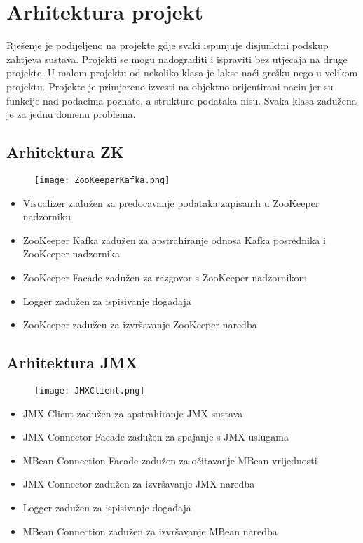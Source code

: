 \documentclass[times, utf8, diplomski, numeric]{fer}
\begin{document}
\section{Arhitektura projekt}

Rješenje je podijeljeno na projekte gdje svaki ispunjuje disjunktni podskup zahtjeva sustava. Projekti se mogu nadograditi i ispraviti bez utjecaja na druge projekte. U malom projektu od nekoliko klasa je lakse naći grešku nego u velikom projektu. Projekte je primjereno izvesti na objektno orijentirani nacin jer su funkcije nad podacima poznate, a strukture podataka nisu. Svaka klasa zadužena je za jednu domenu problema.

\subsection{Arhitektura ZK}

\begin{figure}[H]
    \centering
    \texttt{[image: ZooKeeperKafka.png]}
    \caption{}
    \label{fig:zookeeper-kafka}
\end{figure}

\begin{itemize}
    \item Visualizer zadužen za predocavanje podataka zapisanih u ZooKeeper nadzorniku
    \item ZooKeeper Kafka zadužen za apstrahiranje odnosa Kafka posrednika i ZooKeeper nadzornika
    \item ZooKeeper Facade zadužen za razgovor s ZooKeeper nadzornikom
    \item Logger zadužen za ispisivanje događaja
    \item ZooKeeper zadužen za izvršavanje ZooKeeper naredba
\end{itemize}

\subsection{Arhitektura JMX}

\begin{figure}[H]
    \centering
    \texttt{[image: JMXClient.png]}
    \caption{}
    \label{fig:jmx-client}
\end{figure}

\begin{itemize}
    \item JMX Client zadužen za apstrahiranje JMX sustava
    \item JMX Connector Facade zadužen za spajanje s JMX uslugama
    \item MBean Connection Facade zadužen za očitavanje MBean vrijednosti
    \item JMX Connector zadužen za izvršavanje JMX naredba
    \item Logger zadužen za ispisivanje događaja
    \item MBean Connection zadužen za izvršavanje MBean naredba
\end{itemize}
\end{document}
